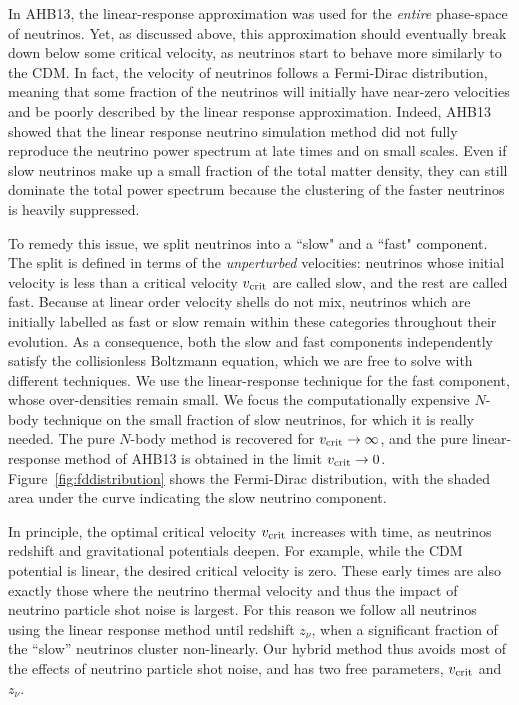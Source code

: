 \documentclass[useAMS, usenatbib]{mnras}
\begin{document}
In AHB13, the linear-response approximation was used for the \emph{entire} phase-space of neutrinos.
Yet, as discussed above, this approximation should eventually break down below some critical velocity, as neutrinos start to behave more similarly to the CDM. In fact, the velocity of neutrinos follows a Fermi-Dirac distribution, meaning that some fraction of the neutrinos will initially have near-zero velocities and be poorly described by the linear response approximation. Indeed, AHB13 showed that the linear response neutrino simulation method did not fully reproduce the neutrino power spectrum at late times and on small scales.
Even if slow neutrinos make up a small fraction of the total matter density, they can still dominate the total power spectrum because the clustering of the faster neutrinos is heavily suppressed.

To remedy this issue, we split neutrinos into a ``slow" and a ``fast" component. The split is defined in terms of the \emph{unperturbed} velocities: neutrinos whose initial velocity is less than a critical velocity $v_{\rm crit}$ are called slow, and the rest are called fast. Because at linear order velocity shells do not mix, neutrinos which are initially labelled as fast or slow remain within these categories throughout their evolution. As a consequence, both the slow and fast components independently satisfy the collisionless Boltzmann equation, which we are free to solve with different techniques. We use the linear-response technique for the fast component, whose over-densities remain small. We focus the computationally expensive $N$-body technique on the small fraction of slow neutrinos, for which it is really needed. The pure $N$-body method is recovered for $v_{\rm crit} \rightarrow \infty$, and the pure linear-response method of AHB13 is obtained in the limit $v_{\rm crit} \rightarrow 0$. Figure~\ref{fig:fddistribution} shows the Fermi-Dirac distribution, with the shaded area under the curve indicating the slow neutrino component.

In principle, the optimal critical velocity $v_{\rm crit}$ increases with time, as neutrinos redshift and gravitational potentials deepen. For example, while the CDM potential is linear, the desired critical velocity is zero. These early times are also exactly those where the neutrino thermal velocity and thus the impact of neutrino particle shot noise is largest. For this reason we follow all neutrinos using the linear response method until redshift $z_{\nu}$, when a significant fraction of the ``slow'' neutrinos cluster non-linearly. Our hybrid method thus avoids most of the effects of neutrino particle shot noise, and has two free parameters, $v_{\rm crit}$ and $z_{\nu}$.
\end{document}
